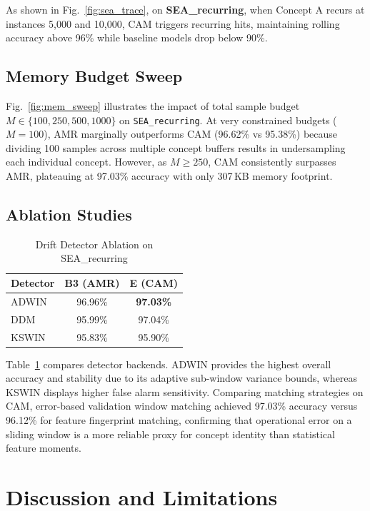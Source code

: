 \documentclass[conference]{IEEEtran}
\begin{document}
As shown in Fig.~\ref{fig:sea_trace}, on \textbf{SEA\_recurring}, when Concept A recurs at instances 5,000 and 10,000, CAM triggers recurring hits, maintaining rolling accuracy above 96\% while baseline models drop below 90\%.

\subsection{Memory Budget Sweep}
Fig.~\ref{fig:mem_sweep} illustrates the impact of total sample budget $M \in \{100, 250, 500, 1000\}$ on \texttt{SEA\_recurring}. At very constrained budgets ($M=100$), AMR marginally outperforms CAM (96.62\% vs 95.38\%) because dividing 100 samples across multiple concept buffers results in undersampling each individual concept. However, as $M \ge 250$, CAM consistently surpasses AMR, plateauing at 97.03\% accuracy with only 307\,KB memory footprint.

\subsection{Ablation Studies}
\begin{table}[htbp]
\centering
\caption{Drift Detector Ablation on SEA\_recurring}
\label{tab:det_ablation}
\begin{tabular}{lcc}
\toprule
\textbf{Detector} & \textbf{B3 (AMR)} & \textbf{E (CAM)} \\
\midrule
ADWIN & 96.96\% & \textbf{97.03\%} \\
DDM   & 95.99\% & 97.04\% \\
KSWIN & 95.83\% & 95.90\% \\
\bottomrule
\end{tabular}
\end{table}

Table~\ref{tab:det_ablation} compares detector backends. ADWIN provides the highest overall accuracy and stability due to its adaptive sub-window variance bounds, whereas KSWIN displays higher false alarm sensitivity. Comparing matching strategies on CAM, error-based validation window matching achieved 97.03\% accuracy versus 96.12\% for feature fingerprint matching, confirming that operational error on a sliding window is a more reliable proxy for concept identity than statistical feature moments.

\section{Discussion and Limitations}
\end{document}
